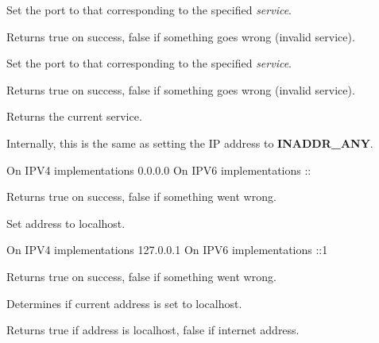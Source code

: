 Set the port to that corresponding to the specified {\it service}.


Returns true on success, false if something goes wrong
(invalid service).

%
%



Set the port to that corresponding to the specified {\it service}.


Returns true on success, false if something goes wrong
(invalid service).

%
%



Returns the current service.

%
%

\label{wxIPaddressanyaddress}


Internally, this is the same as setting the IP address
to {\bf INADDR\_ANY}.

On IPV4 implementations 0.0.0.0
On IPV6 implementations ::


Returns true on success, false if something went wrong.

%
%

\label{wxIPaddresslocalhost}


Set address to localhost. 

On IPV4 implementations 127.0.0.1
On IPV6 implementations ::1


Returns true on success, false if something went wrong.

\label{wxIPaddresslocalhost}


Determines if current address is set to localhost. 


Returns true if address is localhost, false if internet address.


 	  	 
